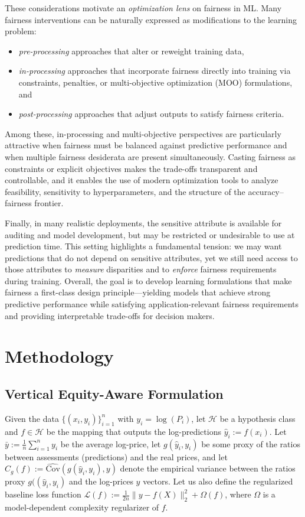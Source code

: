 \documentclass[11pt]{article}
\theoremstyle{plain}
\theoremstyle{definition}
\newcommand{\1}{\mathbf{1}}
\begin{document}
These considerations motivate an \emph{optimization lens} on fairness in ML. Many fairness interventions can be naturally expressed as modifications to the learning problem:
\begin{itemize}
    \item[(i)] \emph{pre-processing} approaches that alter or reweight training data,
    \item[(ii)] \emph{in-processing} approaches that incorporate fairness directly into training via constraints, penalties, or multi-objective optimization (MOO) formulations, and
    \item[(iii)] \emph{post-processing} approaches that adjust outputs to satisfy fairness criteria.
\end{itemize}
Among these, in-processing and multi-objective perspectives are particularly attractive when fairness must be balanced against predictive performance and when multiple fairness desiderata are present simultaneously. Casting fairness as constraints or explicit objectives makes the trade-offs transparent and controllable, and it enables the use of modern optimization tools to analyze feasibility, sensitivity to hyperparameters, and the structure of the accuracy--fairness frontier.

Finally, in many realistic deployments, the sensitive attribute is available for auditing and model development, but may be restricted or undesirable to use at prediction time. This setting highlights a fundamental tension: we may want predictions that do not depend on sensitive attributes, yet we still need access to those attributes to \emph{measure} disparities and to \emph{enforce} fairness requirements during training. Overall, the goal is to develop learning formulations that make fairness a first-class design principle---yielding models that achieve strong predictive performance while satisfying application-relevant fairness requirements and providing interpretable trade-offs for decision makers.

\newpage

\section{Methodology}

\subsection{Vertical Equity-Aware Formulation}


Given the data $\{(x_i,y_i)\}_{i=1}^n$ with $y_i=\log(P_i)$, let $\mathcal H$ be a hypothesis class and
$f\in\mathcal H$ be the mapping that outputs the log-predictions $\hat y_i:=f(x_i)$. Let $\bar y:=\frac1n\sum_{i=1}^n y_i$ be the average log-price, let $g(\hat y_i,y_i)$ be some proxy of the ratios between assessments (predictions) and the real prices, and let $C_{g}(f):=\widehat{\text{Cov}}(g(\hat y_i,y_i), y)$ denote the empirical variance between the ratios proxy $g((\hat y_i,y_i)$ and the log-prices $y$ vectors. Let us also define the regularized baseline loss function $\mathcal{L}(f):=\frac{1}{2n}\|y-f(X)\|_2^2 + \Omega(f)$, where $\Omega$ is a model-dependent complexity regularizer of $f$.  
\end{document}

